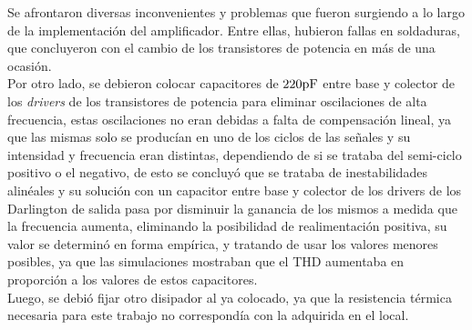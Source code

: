  
 
Se afrontaron diversas inconvenientes y problemas que fueron surgiendo a lo largo de la implementación del amplificador. Entre ellas, hubieron fallas en soldaduras, que concluyeron con el cambio de los transistores de potencia en más de una ocasión. \\


Por otro lado, se debieron colocar capacitores de $220\si[per-mode=symbol]{\pico\farad}$ entre base y colector de los \textit{drivers} de los transistores de potencia para eliminar oscilaciones de alta frecuencia, estas oscilaciones no eran debidas a falta de compensación lineal, ya que las mismas solo se producían en uno de los ciclos de las señales y su intensidad y frecuencia eran distintas, dependiendo de si se trataba del semi-ciclo positivo o el negativo, de esto se concluyó que se trataba de inestabilidades alinéales y su solución con un capacitor entre base y colector de los drivers de los Darlington de salida pasa por disminuir la ganancia de los mismos a medida que la frecuencia aumenta, eliminando la posibilidad de realimentación positiva, su valor se determinó en forma empírica, y tratando de usar los valores menores posibles, ya que las simulaciones mostraban que el THD aumentaba en proporción a los valores de estos capacitores.\\


Luego, se debió fijar otro disipador al ya colocado, ya que la resistencia térmica necesaria para este trabajo no correspondía con la adquirida en el local.